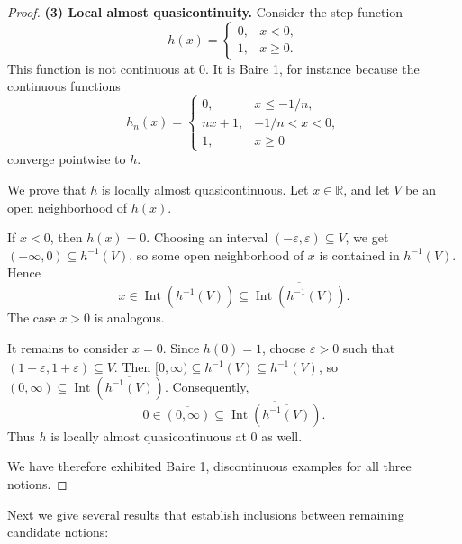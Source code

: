 \documentclass[11pt]{amsart} %
\theoremstyle{definition}
\begin{document}
\begin{proof}
\medskip
\noindent
\textbf{(3) Local almost quasicontinuity.}
Consider the step function
\begin{equation} 
 h(x)=
 \begin{cases}
 0,& x<0,\\
 1,& x\ge 0.
 \end{cases}
\end{equation} 
This function is not continuous at \(0\). It is Baire 1, for instance because the continuous functions
\begin{equation} 
 h_n(x)=
 \begin{cases}
 0,& x\le -1/n,\\
 nx+1,& -1/n<x<0,\\
 1,& x\ge 0
 \end{cases}
\end{equation} 
converge pointwise to \(h\).

We prove that \(h\) is locally almost quasicontinuous. Let \(x\in\mathbb R\), and let \(V\) be an open neighborhood of \(h(x)\).

If \(x<0\), then \(h(x)=0\). Choosing an interval \(( -\varepsilon,\varepsilon)\subseteq V\), we get
$(-\infty,0)\subseteq h^{-1}(V)$, 
so some open neighborhood of \(x\) is contained in \(h^{-1}(V)\). Hence 
\begin{equation} 
 x\in \operatorname{Int}(\overline{h^{-1}(V)})\subseteq \overline{\operatorname{Int}(\overline{h^{-1}(V)})}.
\end{equation}  
The case \(x>0\) is analogous.

It remains to consider \(x=0\). Since \(h(0)=1\), choose \(\varepsilon>0\) such that
$(1-\varepsilon,1+\varepsilon)\subseteq V.$
Then $[0,\infty)\subseteq h^{-1}(V)\subseteq \overline{h^{-1}(V)}$, 
so $(0,\infty)\subseteq \operatorname{Int}(\overline{h^{-1}(V)}).$
Consequently, 
\begin{equation} 
0\in \overline{(0,\infty)}\subseteq \overline{\operatorname{Int}(\overline{h^{-1}(V)})}.
\end{equation} 
Thus \(h\) is locally almost quasicontinuous at \(0\) as well.

We have therefore exhibited Baire 1, discontinuous examples for all three notions.
\end{proof}

Next we give several results that establish inclusions between remaining candidate notions: 
\end{document}
